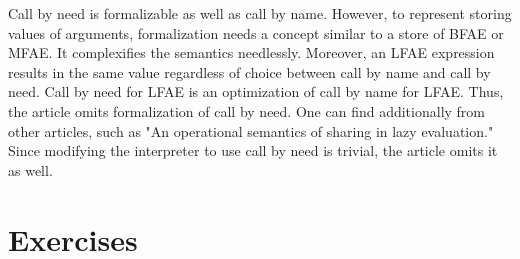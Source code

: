Call by need is formalizable as well as call by name. However, to represent
storing values of arguments, formalization needs a concept similar to a store of
BFAE or MFAE. It complexifies the semantics needlessly. Moreover, an LFAE
expression results in the same value regardless of choice between call by name
and call by need. Call by need for LFAE is an optimization of call by name for
LFAE. Thus, the article omits formalization of call by need. One can find
additionally from other articles, such as "An operational semantics of sharing in
lazy evaluation." Since modifying the interpreter to use call by need is
trivial, the article omits it as well.

\section{Exercises}
